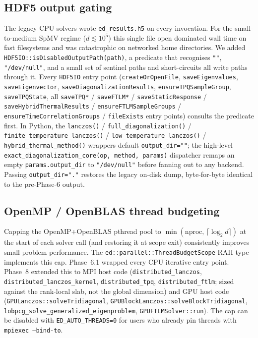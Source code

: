 \documentclass[submission, PhysCodeb]{SciPost}
\begin{document}
\subsection{HDF5 output gating}
\label{sec:perf-hdf5}
The legacy CPU solvers wrote \texttt{ed\_results.h5} on every
invocation. For the small-to-medium SpMV regime
($d \lesssim 10^5$) this single file open dominated wall time on
fast filesystems and was catastrophic on networked home directories.
We added \texttt{HDF5IO::isDisabledOutputPath(path)}, a
predicate that recognises \texttt{""}, \texttt{"/dev/null"}, and a
small set of sentinel paths and short-circuits all write paths
through it. Every \texttt{HDF5IO} entry point
(\texttt{createOrOpenFile}, \texttt{saveEigenvalues},
\texttt{saveEigenvector}, \texttt{saveDiagonalizationResults},
\texttt{ensureTPQSampleGroup}, \texttt{saveTPQState}, all
\texttt{saveTPQ*} / \texttt{saveFTLM*} / \texttt{saveStaticResponse} /
\texttt{saveHybridThermalResults} / \texttt{ensureFTLMSampleGroups} /
\texttt{ensureTimeCorrelationGroups} / \texttt{fileExists} entry
points) consults the predicate first. In Python, the
\texttt{lanczos()} / \texttt{full\_diagonalization()} /
\texttt{finite\_temperature\_lanczos()} /
\texttt{low\_temperature\_lanczos()} /
\texttt{hybrid\_thermal\_method()} wrappers default
\texttt{output\_dir=""}; the high-level
\texttt{exact\_diagonalization\_core(op, method, params)} dispatcher
remaps an empty \texttt{params.output\_dir} to \texttt{"/dev/null"}
before fanning out to any backend. Passing \texttt{output\_dir="."}
restores the legacy on-disk dump, byte-for-byte identical to the
pre-Phase-6 output.

\subsection{OpenMP / OpenBLAS thread budgeting}
\label{sec:perf-threads}
Capping the OpenMP+OpenBLAS pthread pool to
$\min(\text{nproc},\, \lceil\log_2 d\rceil)$ at the start of each
solver call (and restoring it at scope exit) consistently improves
small-problem performance. The \texttt{ed::parallel::ThreadBudgetScope}
RAII type implements this cap. Phase~6.1 wrapped every CPU
iterative entry point. Phase~8 extended this to MPI host code
(\texttt{distributed\_lanczos}, \texttt{distributed\_lanczos\_kernel},
\texttt{distributed\_tpq}, \texttt{distributed\_ftlm}; sized against
the rank-local slab, not the global dimension) and GPU host code
(\texttt{GPULanczos::solveTridiagonal},
\texttt{GPUBlockLanczos::solveBlockTridiagonal},
\texttt{lobpcg\_solve\_generalized\_eigenproblem},
\texttt{GPUFTLMSolver::run}). The cap can be disabled with
\texttt{ED\_AUTO\_THREADS=0} for users who already pin threads with
\texttt{mpiexec --bind-to}.
\end{document}
